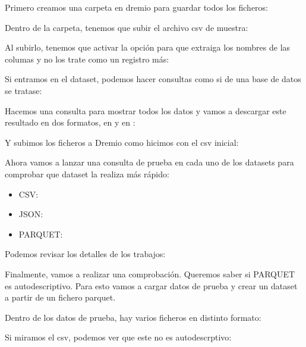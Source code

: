 \documentclass{../../../miPlantilla}
\begin{document}
Primero creamos una carpeta en dremio para guardar todos los ficheros:


Dentro de la carpeta, tenemos que subir el archivo csv de muestra:


\newpage

Al subirlo, tenemos que activar la opción para que extraiga los nombres de las columas y no los trate como un registro más:


Si entramos en el dataset, podemos hacer consultas como si de una base de datos se tratase:


\newpage

Hacemos una consulta para mostrar todos los datos y vamos a descargar este resultado en dos formatos, en  y en :


Y subimos los ficheros a Dremio como hicimos con el csv inicial:


Ahora vamos a lanzar una consulta de prueba en cada uno de los datasets para comprobar que dataset la realiza más rápido:

\begin{itemize}
    \item CSV:
    \item JSON:
    \item PARQUET:
\end{itemize}

Podemos revisar los detalles de los trabajos:


\newpage

Finalmente, vamos a realizar una comprobación. Queremos saber si PARQUET es autodescriptivo. Para esto vamos a cargar datos de prueba
y crear un dataset a partir de un fichero parquet.


Dentro de los datos de prueba, hay varios ficheros en distinto formato:


\newpage

Si miramos el csv, podemos ver que este no es autodescrptivo:
\end{document}
